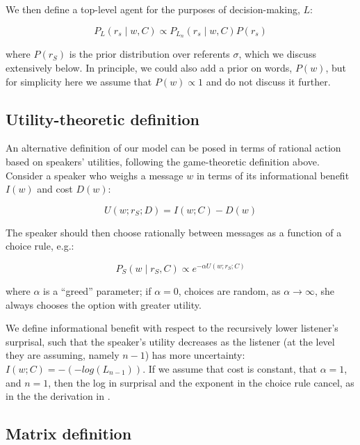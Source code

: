 \documentclass[man,noapacite]{apa2}
\begin{document}
We then define a top-level agent for the purposes of decision-making, $L$:

\begin{equation}
P_L (r_s \mid w, C) \propto P_{L_n} (r_s \mid w, C) P(r_s)
\end{equation}

\noindent where $P(r_S)$ is the prior distribution over referents $\sigma$, which we discuss extensively below. In principle, we could also add a prior on words, $P(w)$, but for simplicity here we assume that $P(w) \propto 1$ and do not discuss it further.

\subsection{Utility-theoretic definition}

An alternative definition of our model can be posed in terms of rational action based on speakers' utilities, following the game-theoretic definition above. Consider a speaker who weighs a message $w$ in terms of its informational benefit $I(w)$ and cost $D(w)$:

\begin{equation}
U(w; r_S; D) = I(w; C) - D(w)
\end{equation}

\noindent The speaker should then choose rationally between messages as a function of a choice rule, e.g.:

\begin{equation}
P_S(w \mid r_S, C) \propto e^{-\alpha U(w;r_S; C)}
\end{equation}

\noindent where $\alpha$ is a ``greed'' parameter; if $\alpha=0$, choices are random, as $\alpha \rightarrow \infty$, she always chooses the option with greater utility.

We define informational benefit with respect to the recursively lower listener's surprisal, such that the speaker's utility decreases as the listener (at the level they are assuming, namely $n-1$) has more uncertainty: $I(w; C) = -(-log(L_{n-1}))$. If we assume that cost is constant, that $\alpha=1$, and $n=1$, then the log in surprisal and the exponent in the choice rule cancel, as in the the derivation in .

\subsection{Matrix definition}
\end{document}
